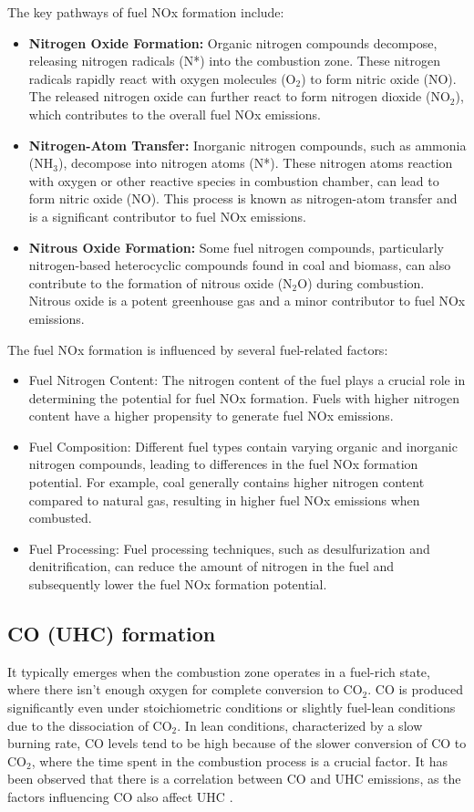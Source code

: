 The key pathways of fuel NOx formation include:
\begin{itemize}
    \item \textbf{Nitrogen Oxide Formation:} Organic nitrogen compounds decompose, releasing nitrogen radicals (N*) into the combustion zone. These nitrogen radicals rapidly react with oxygen molecules (O$_2$) to form nitric oxide (NO). The released nitrogen oxide can further react to form nitrogen dioxide (NO$_2$), which contributes to the overall fuel NOx emissions.
    \item \textbf{Nitrogen-Atom Transfer:} Inorganic nitrogen compounds, such as ammonia (NH$_3$), decompose into nitrogen atoms (N*). These nitrogen atoms reaction with oxygen or other reactive species in combustion chamber, can lead to form nitric oxide (NO). This process is known as nitrogen-atom transfer and is a significant contributor to fuel NOx emissions.
    \item \textbf{Nitrous Oxide Formation:} Some fuel nitrogen compounds, particularly nitrogen-based heterocyclic compounds found in coal and biomass, can also contribute to the formation of nitrous oxide (N$_2$O) during combustion. Nitrous oxide is a potent greenhouse gas and a minor contributor to fuel NOx emissions.
\end{itemize}

The fuel NOx formation is influenced by several fuel-related factors:
\begin{itemize}
    \item Fuel Nitrogen Content: The nitrogen content of the fuel plays a crucial role in determining the potential for fuel NOx formation. Fuels with higher nitrogen content have a higher propensity to generate fuel NOx emissions.
    \item Fuel Composition: Different fuel types contain varying organic and inorganic nitrogen compounds, leading to differences in the fuel NOx formation potential. For example, coal generally contains higher nitrogen content compared to natural gas, resulting in higher fuel NOx emissions when combusted.
    \item Fuel Processing: Fuel processing techniques, such as desulfurization and denitrification, can reduce the amount of nitrogen in the fuel and subsequently lower the fuel NOx formation potential.
\end{itemize}

\subsection{CO (UHC) formation}
It typically emerges when the combustion zone operates in a fuel-rich state, where there isn't enough oxygen for complete conversion to CO$_2$. CO is produced significantly even under stoichiometric conditions or slightly fuel-lean conditions due to the dissociation of CO$_2$. In lean conditions, characterized by a slow burning rate, CO levels tend to be high because of the slower conversion of CO to CO$_2$, where the time spent in the combustion process is a crucial factor. It has been observed that there is a correlation between CO and UHC emissions, as the factors influencing CO also affect UHC \cite{LAH2010}.

